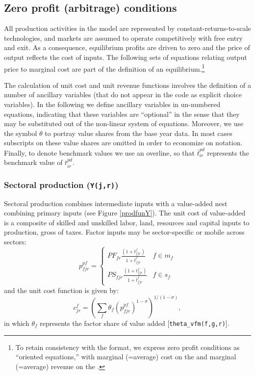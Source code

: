 \subsection[Zero profit]{Zero profit (arbitrage) conditions}

All production activities in the model are represented by
constant-returns-to-scale technologies, and markets are assumed to
operate competitively with free entry and exit. As a consequence,
equilibrium profits are driven to zero and the price of output
reflects the cost of inputs. The following sets of equations relating
output price to marginal cost are part of the definition of an
equilibrium.\footnote{To retain consistency with the \MCP format, we
express zero profit conditions as ``oriented equations,'' with
marginal (=average) cost on the \LHS and marginal (=average) revenue on
the \RHS.}

The calculation of unit cost and unit revenue functions involves the
definition of a number of ancillary variables (that do not appear in
the \GAMS code as explicit choice variables). In the following we
define ancillary variables in un-numbered equations, indicating that
these variables are ``optional'' in the sense that they may be
substituted out of the non-linear system of equations. Moreover, we
use the symbol $\theta$ to portray value shares from the base year
data. In most cases subscripts on these value shares are omitted in
order to economize on notation. Finally, to denote benchmark values we
use an overline, so that $\overline{t}^{pd}_{ir}$ represents the
benchmark value of ${t}^{pd}_{ir}$.

\subsubsection[Production]{Sectoral production (\texttt{Y(j,r)})}

Sectoral production combines intermediate inputs with a value-added
nest combining primary inputs (see Figure \ref{prodfunY}). The unit
cost of value-added is a \CES composite of skilled and unskilled labor,
land, resources and capital inputs to production, gross of taxes.
Factor inputs may be sector-specific or mobile across sectors:
$$p^{pf}_{fjr} = \left\{\begin{array}{lr}
\mathit{PF}_{fr} \frac{(1+t^f_{fjr})}{1+\overline{t}^f_{fjr}} & f \in m_f\\
\mathit{PS}_{fjr} \frac{(1+t^f_{fjr})}{1+\overline{t}^f_{fjr}} & f \in s_f
\end{array} \right.$$
and the unit cost function is given by:
$$c^f_{jr} = \left( \sum_f \theta_f \left( p^{pf}_{fjr}
\right)^{1-\sigma} \right)^{1/(1-\sigma)},$$
in which $\theta_f$ represents the factor share of value added
[{\small \texttt{theta\_vfm(f,g,r)}}].

